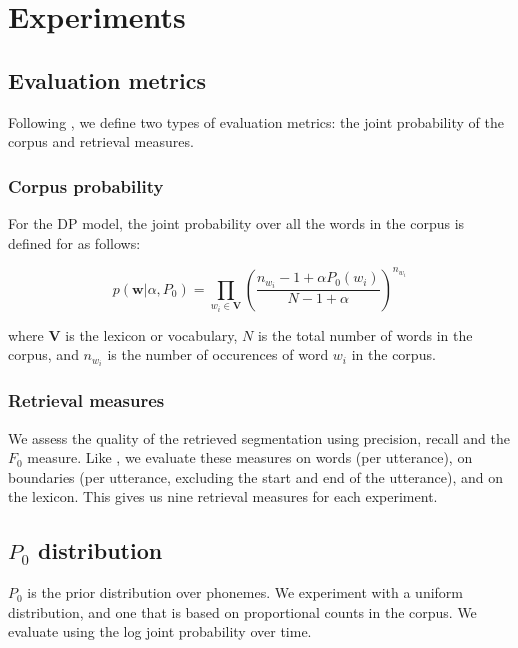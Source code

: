 \section{Experiments}

\subsection{Evaluation metrics}

Following \cite{Goldwater200921}, we define two types of evaluation metrics: the joint probability of the corpus and retrieval measures.

\subsubsection{Corpus probability}

For the DP model, the joint probability over all the words in the corpus is defined for as follows:

\begin{equation}
p(\mathbf{w} | \alpha, P_0) = \prod_{w_i \in \mathbf{V}} \left( \frac{n_{w_i} - 1 + \alpha P_0(w_i)}{N - 1 + \alpha} \right)^{n_{w_i}}
\end{equation}

where $\mathbf{V}$ is the lexicon or vocabulary, $N$ is the total number of words in the corpus, and $n_{w_i}$ is the number of occurences of word $w_i$ in the corpus.

\subsubsection{Retrieval measures}

We assess the quality of the retrieved segmentation using precision, recall and the $F_0$ measure. Like \cite{Goldwater200921}, we evaluate these measures on words (per utterance), on boundaries (per utterance, excluding the start and end of the utterance), and on the lexicon. This gives us nine retrieval measures for each experiment.

\subsection{$P_0$ distribution}

$P_0$ is the prior distribution over phonemes. We experiment with a uniform distribution, and one that is based on proportional counts in the corpus. We evaluate using the log joint probability over time.

